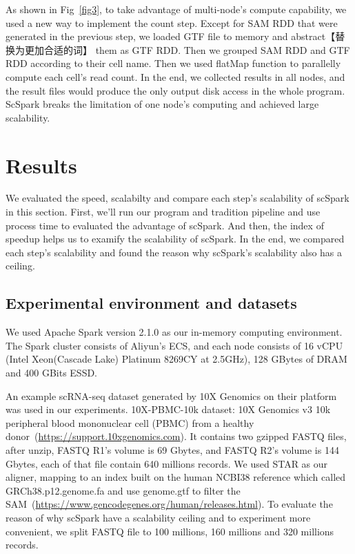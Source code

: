 \documentclass[conference]{IEEEtran}
\begin{document}
As shown in Fig~\ref{fig3}, to take advantage of multi-node's compute capability, we used a new way to implement the count step. 
Except for SAM RDD that were generated in the previous step, we loaded GTF file to memory and abstract【替换为更加合适的词】 them as GTF RDD. 
Then we grouped SAM RDD and GTF RDD according to their cell name. 
Then we used flatMap function to parallelly compute each cell's read count. 
In the end, we collected results in all nodes, and the result files would produce the only output disk access in the whole program. 
ScSpark breaks the limitation of one node's computing and achieved large scalability. 

\section{Results}
We evaluated the speed, scalabilty and compare each step's scalability of scSpark in this section. 
First, we'll run our program and tradition pipeline and use process time to evaluated the advantage of scSpark. 
And then, the index of speedup helps us to examify the scalability of scSpark.
In the end, we compared each step's scalability and found the reason why scSpark's scalability also has a ceiling. 

\subsection{Experimental environment and datasets}
We used Apache Spark version 2.1.0 as our in-memory computing environment.
The Spark cluster consists of Aliyun's ECS, and each node consists of 16 vCPU
(Intel Xeon(Cascade Lake) Platinum 8269CY at 2.5GHz), 128 GBytes of DRAM and 400 GBits ESSD.

An example scRNA-seq dataset generated by 10X Genomics on their platform was used in our experiments.
10X-PBMC-10k dataset: 10X Genomics v3 10k peripheral blood mononuclear cell (PBMC) from a healthy donor~(\url{https://support.10xgenomics.com}). 
It contains two gzipped FASTQ files, after unzip, FASTQ R1's volume is 69 Gbytes, and FASTQ R2's volume is 144 Gbytes, each of that file contain 640 millions records.
We used STAR as our aligner, mapping to an index built on the human NCBI38 reference which called GRCh38.p12.genome.fa and use genome.gtf to filter the SAM~(\url{https://www.gencodegenes.org/human/releases.html}).
To evaluate the reason of why scSpark have a scalability ceiling and to experiment more convenient, we split FASTQ file to 100 millions, 160 millions and 320 millions records. 
\end{document}
